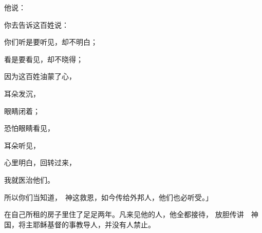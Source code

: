 {他说：
\par }{\Q 你去告诉这百姓说：
\par }{\Q 你们听是要听见，却不明白；
\par }{\Q 看是要看见，却不晓得；
\par }{\Q {}因为这百姓油蒙了心，
\par }{\Q 耳朵发沉，
\par }{\Q 眼睛闭着；
\par }{\Q 恐怕眼睛看见，
\par }{\Q 耳朵听见，
\par }{\Q 心里明白，回转过来，
\par }{\Q 我就医治他们。
\par }{\MM {}所以你们当知道，　神这救恩，如今传给外邦人，他们也必听受。」
\par }{\PP {}在自己所租的房子里住了足足两年。凡来见他的人，他全都接待，
放胆传讲　神国{}，将主耶稣基督的事教导人，并没有人禁止。
\par }